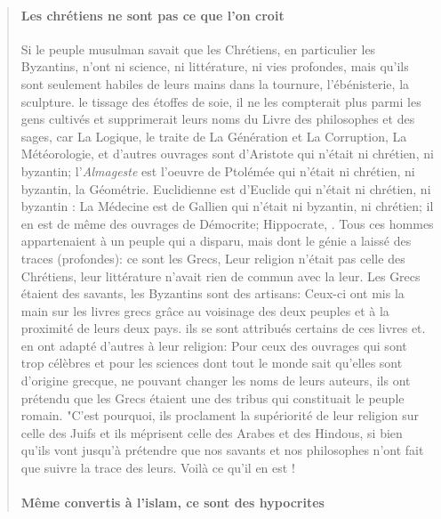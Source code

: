 \begin{quote}
    
\paragraph{Les chrétiens ne sont pas ce que l'on croit}
Si le peuple musulman savait que les Chrétiens, en particulier les Byzantins, n'ont ni science, ni littérature, ni vies profondes, mais qu'ils sont seulement habiles de leurs mains dans la tournure, l'ébénisterie, la sculpture. le tissage des étoffes de soie, il ne les compterait plus parmi les gens cultivés et supprimerait leurs noms du Livre des philosophes et des sages, car La Logique, le traite de La Génération et La Corruption, La Météorologie, et d'autres ouvrages sont d'Aristote qui n'était ni chrétien, ni byzantin; l'\textit{Almageste} est l'oeuvre de Ptolémée qui n'était ni chrétien, ni byzantin, la Géométrie. Euclidienne est d'Euclide qui n'était ni chrétien, ni byzantin : La Médecine est de Gallien qui n'était ni byzantin, ni chrétien; il en est de même des ouvrages de Démocrite; Hippocrate, . Tous ces hommes appartenaient à un peuple qui a disparu, mais dont le génie a laissé des traces (profondes): ce sont les Grecs, Leur religion n'était pas celle des Chrétiens, leur littérature n'avait rien de commun avec la leur. Les Grecs étaient des savants, les Byzantins sont des artisans: Ceux-ci ont mis la main sur les livres grecs grâce au voisinage des deux peuples et à la proximité de leurs deux pays. ils se sont attribués certains de ces livres et. en ont adapté d'autres à leur religion: Pour ceux des ouvrages qui sont trop célèbres et pour les sciences dont tout   le monde sait qu'elles sont d'origine grecque, ne pouvant changer les noms de leurs auteurs, ils ont prétendu que les Grecs étaient une des tribus qui constituait le peuple romain.
"C'est pourquoi, ils proclament la supériorité de leur religion sur celle des Juifs et ils méprisent celle des Arabes et des Hindous, si bien qu'ils vont jusqu'à prétendre que nos savants et nos philosophes n'ont fait que suivre la trace des leurs. Voilà ce qu'il en est !

\paragraph{Même convertis à l'islam, ce sont des hypocrites}



\end{quote}
